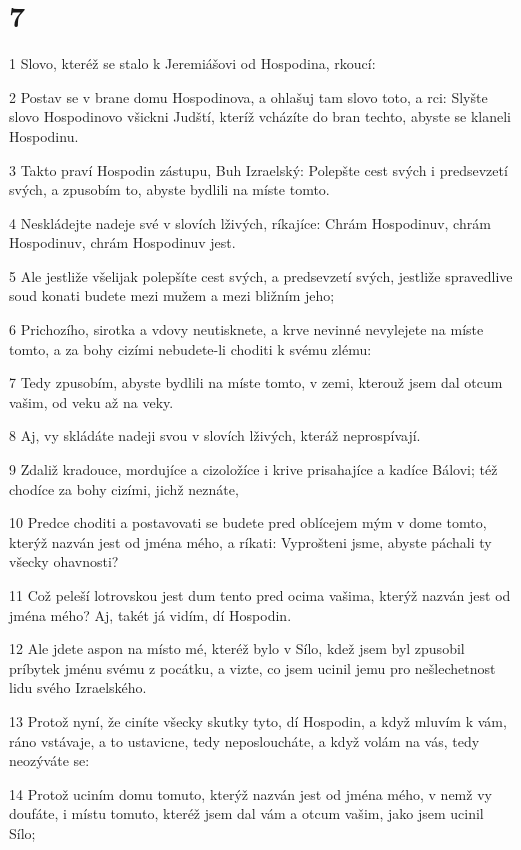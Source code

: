 \chapter{7}

\par 1 Slovo, kteréž se stalo k Jeremiášovi od Hospodina, rkoucí:
\par 2 Postav se v brane domu Hospodinova, a ohlašuj tam slovo toto, a rci: Slyšte slovo Hospodinovo všickni Judští, kteríž vcházíte do bran techto, abyste se klaneli Hospodinu.
\par 3 Takto praví Hospodin zástupu, Buh Izraelský: Polepšte cest svých i predsevzetí svých, a zpusobím to, abyste bydlili na míste tomto.
\par 4 Neskládejte nadeje své v slovích lživých, ríkajíce: Chrám Hospodinuv, chrám Hospodinuv, chrám Hospodinuv jest.
\par 5 Ale jestliže všelijak polepšíte cest svých, a predsevzetí svých, jestliže spravedlive soud konati budete mezi mužem a mezi bližním jeho;
\par 6 Prichozího, sirotka a vdovy neutisknete, a krve nevinné nevylejete na míste tomto, a za bohy cizími nebudete-li choditi k svému zlému:
\par 7 Tedy zpusobím, abyste bydlili na míste tomto, v zemi, kterouž jsem dal otcum vašim, od veku až na veky.
\par 8 Aj, vy skládáte nadeji svou v slovích lživých, kteráž neprospívají.
\par 9 Zdaliž kradouce, mordujíce a cizoložíce i krive prisahajíce a kadíce Bálovi; též chodíce za bohy cizími, jichž neznáte,
\par 10 Predce choditi a postavovati se budete pred oblícejem mým v dome tomto, kterýž nazván jest od jména mého, a ríkati: Vyprošteni jsme, abyste páchali ty všecky ohavnosti?
\par 11 Což peleší lotrovskou jest dum tento pred ocima vašima, kterýž nazván jest od jména mého? Aj, takét já vidím, dí Hospodin.
\par 12 Ale jdete aspon na místo mé, kteréž bylo v Sílo, kdež jsem byl zpusobil príbytek jménu svému z pocátku, a vizte, co jsem ucinil jemu pro nešlechetnost lidu svého Izraelského.
\par 13 Protož nyní, že ciníte všecky skutky tyto, dí Hospodin, a když mluvím k vám, ráno vstávaje, a to ustavicne, tedy neposloucháte, a když volám na vás, tedy neozýváte se:
\par 14 Protož uciním domu tomuto, kterýž nazván jest od jména mého, v nemž vy doufáte, i místu tomuto, kteréž jsem dal vám a otcum vašim, jako jsem ucinil Sílo;
